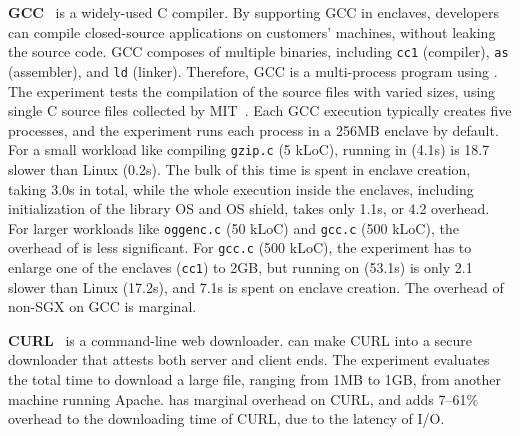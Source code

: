{\bf GCC}~\cite{gcc} is a widely-used C compiler.
By supporting GCC in enclaves, developers can compile closed-source applications on customers' machines,
without leaking the source code.
GCC composes of multiple binaries, including {\tt cc1} (compiler), {\tt as} (assembler), and {\tt ld} (linker).
Therefore, GCC is a multi-process program using .
The experiment tests the compilation of the source files with varied sizes,
using single C source files collected by MIT~\cite{gcc-benchmark}.
Each GCC execution typically  creates five processes, and the experiment runs each process in a 256MB enclave by default.
For a small workload like compiling {\tt gzip.c} (5 kLoC), running in \graphenesgx{} (4.1s) is 18.7\x{} slower than Linux (0.2s).
The bulk of this time is spent in enclave creation, taking 3.0s in total, while the whole execution inside the enclaves, including initialization of the library OS and OS shield, takes only 1.1s, or 4.2\x{} overhead.
For larger workloads like {\tt oggenc.c} (50 kLoC) and {\tt gcc.c} (500 kLoC), 
the overhead of \graphenesgx{} is less significant. %
For {\tt gcc.c} (500 kLoC), the experiment has to enlarge one of the enclaves ({\tt cc1}) to 2GB,
but running on \graphenesgx{} (53.1s) is only 2.1\x{} slower than Linux (17.2s),
and 7.1s is spent on enclave creation.
The overhead of non-SGX \graphene{} on GCC is marginal.




{\bf CURL}~\cite{curl} is a command-line  web downloader.
\graphenesgx{} can make CURL into a secure downloader that attests both server and client ends.
The experiment evaluates the total time to download a large file, ranging from 1MB to 1GB, from another machine running Apache. %
\graphene{} has marginal overhead on CURL, and
\graphenesgx{} adds 7--61\% overhead to the downloading time of CURL, due to the latency of I/O.


\makeatletter
{}
\makeatother
\graphicspath{{eval/figures/}}

